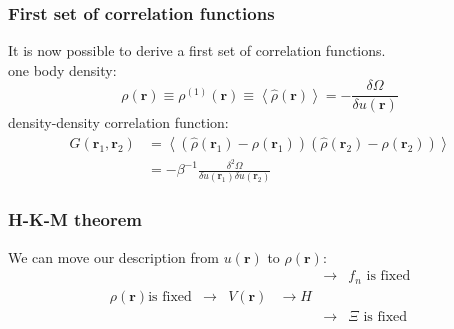 \documentclass[12pt,notes=off,unicode]{beamer}
\begin{document}
  \begin{frame}[c]\frametitle{First set of correlation functions}
    It is now possible to derive a first set of correlation functions.\\
    one body density:
      \begin{equation}
        \rho(\mathbf{r})\equiv\rho^{(1)}{(\mathbf{r})}\equiv\left<\hat\rho(\mathbf{r})\right> = 
        - \frac{\delta\Omega}{\delta u (\mathbf{r})}
      \end{equation}
    density-density correlation function:
    \begin{equation}
      \begin{split}
      G(\mathbf{r}_1,\mathbf{r}_2)&=
      \left<
        \left(
          \hat\rho\left(\mathbf{r}_1\right) - \rho\left(\mathbf{r}_1\right)
        \right)
        \left(
          \hat\rho\left(\mathbf{r}_2\right) - \rho\left(\mathbf{r}_2\right)
        \right)
        \right> \\
      &=-\beta^{-1}\frac{\delta^2\Omega}{\delta u (\mathbf{r}_1)\delta u (\mathbf{r}_2)}
      \end{split}
    \end{equation}
  \end{frame}

  \begin{frame}[c]\frametitle{H-K-M theorem}
      
  We can move our description from $u(\mathbf{r})$ to $\rho(\mathbf{r})$:
  \begin{equation}
    \begin{matrix}
      & & & & \rightarrow & f_n \text{ is fixed} \\
      \rho(\mathbf{r}) \text{is fixed} & \rightarrow & V(\mathbf{r}) & \rightarrow H & \\
      & & & & \rightarrow & \Xi \text{ is fixed} 
    \end{matrix}
  \end{equation}
  \end{frame}
\end{document}
